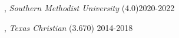 
, \textit{Southern Methodist University}	 (4.0)\hfill 2020-2022

, \textit{Texas Christian} (3.670) \hfill	2014-2018 


